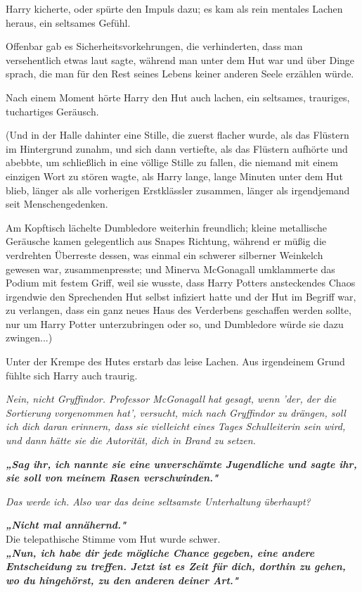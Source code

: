 {Harry kicherte, oder spürte den Impuls dazu; es kam als rein mentales Lachen heraus, ein seltsames Gefühl.

Offenbar gab es Sicherheitsvorkehrungen, die verhinderten, dass man versehentlich etwas laut sagte, während man unter dem Hut war und über Dinge sprach, die man für den Rest seines Lebens keiner anderen Seele erzählen würde.

Nach einem Moment hörte Harry den Hut auch lachen, ein seltsames, trauriges, tuchartiges Geräusch.

(Und in der Halle dahinter eine Stille, die zuerst flacher wurde, als das Flüstern im Hintergrund zunahm, und sich dann vertiefte, als das Flüstern aufhörte und abebbte, um schließlich in eine völlige Stille zu fallen, die niemand mit einem einzigen Wort zu stören wagte, als Harry lange, lange Minuten unter dem Hut blieb, länger als alle vorherigen Erstklässler zusammen, länger als irgendjemand seit Menschengedenken.

Am Kopftisch lächelte Dumbledore weiterhin freundlich; kleine metallische Geräusche kamen gelegentlich aus Snapes Richtung, während er müßig die verdrehten Überreste dessen, was einmal ein schwerer silberner Weinkelch gewesen war, zusammenpresste; und Minerva McGonagall umklammerte das Podium mit festem Griff, weil sie wusste, dass Harry Potters ansteckendes Chaos irgendwie den Sprechenden Hut selbst infiziert hatte und der Hut im Begriff war, zu verlangen, dass ein ganz neues Haus des Verderbens geschaffen werden sollte, nur um Harry Potter unterzubringen oder so, und Dumbledore würde sie dazu zwingen...)

Unter der Krempe des Hutes erstarb das leise Lachen. Aus irgendeinem Grund fühlte sich Harry auch traurig.

\emph{Nein, nicht Gryffindor. Professor McGonagall hat gesagt, wenn 'der, der die Sortierung vorgenommen hat', versucht, mich nach Gryffindor zu drängen, soll ich dich daran erinnern, dass sie vielleicht eines Tages Schulleiterin sein wird, und dann hätte sie die Autorität, dich in Brand zu setzen.}

\textbf{\emph{„Sag ihr, ich nannte sie eine unverschämte Jugendliche und sagte ihr, sie soll von meinem Rasen verschwinden."}}

\emph{Das werde ich. Also war das deine seltsamste Unterhaltung überhaupt?}

\textbf{\emph{„Nicht mal annähernd."}}\\ Die telepathische Stimme vom Hut wurde schwer.\\ \textbf{\emph{„Nun, ich habe dir jede mögliche Chance gegeben, eine andere Entscheidung zu treffen. Jetzt ist es Zeit für dich, dorthin zu gehen, wo du hingehörst, zu den anderen deiner Art."}}

}
